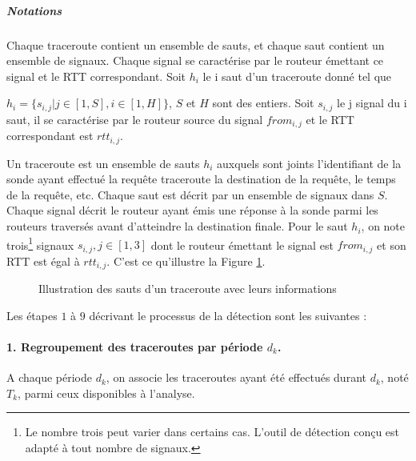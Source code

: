 \subparagraph{Notations} Chaque traceroute contient un ensemble de sauts, et chaque saut contient un ensemble de signaux. Chaque signal se caractérise par le routeur émettant ce signal et le RTT correspondant. 
Soit  $h_i$ le i saut d'un traceroute donné tel que

 $h_i =\{s_{i,j} |  j \in [1, S], i\in [1,H]  \}$, $S$ et $H$ sont des entiers. Soit $ s_{i,j} $  le j signal du i saut, il se caractérise par le routeur  source du signal $from_{i,j}$ et le RTT correspondant est $rtt_{i,j}$.

Un traceroute  est un ensemble de sauts $h_i$ auxquels sont joints l'identifiant de la sonde ayant effectué la requête traceroute  la destination de la requête, le temps de la requête, etc. Chaque saut est décrit par un ensemble de signaux dans  $S$.  Chaque signal décrit le routeur ayant émis une réponse à la sonde parmi les routeurs traversés avant d'atteindre la destination finale.  Pour le saut $h_i$, on note trois\footnote{Le nombre trois peut varier dans certains cas. L'outil de détection conçu est adapté à tout nombre de signaux.} signaux $s_{i, j},  j\in [1,3]$ dont le routeur émettant le signal est $from_{i,j}$ et son RTT est égal à $rtt_{i,j}$. C'est ce qu'illustre  la Figure \ref{fig:traceroute}.

\begin{figure}[H]
	\centering
	\captionsetup{justification=centering}
	\resizebox{\textwidth}{!}{
		
	}
	\caption{Illustration des sauts d'un traceroute avec leurs informations}
	\label{fig:traceroute}
\end{figure}


Les étapes $ 1$ à $9$ décrivant le processus de la détection sont les suivantes : 

\paragraph{1. Regroupement des traceroutes  par période $d_k$.} A chaque période $d_k$, on associe les traceroutes ayant été effectués durant $d_k$, noté $T_k$,  parmi ceux disponibles à l'analyse. 


